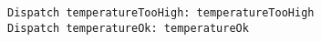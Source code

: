 \begin{lstlisting}
Dispatch temperatureTooHigh: temperatureTooHigh
Dispatch temperatureOk: temperatureOk

\end{lstlisting}